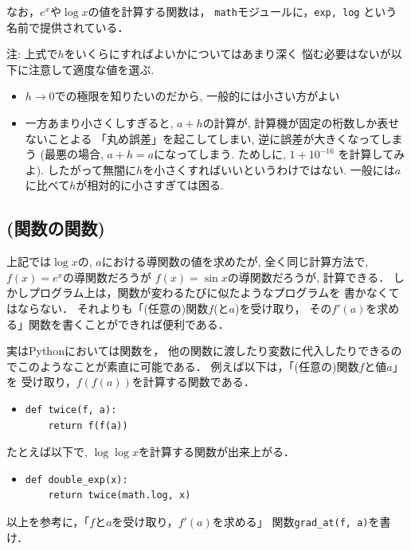 \documentclass[10pt,dvipdfmx]{article}
\begin{document}
なお，$e^x$や$\log x$の値を計算する関数は，
{\tt math}モジュールに，{\tt exp, log}
という名前で提供されている．

注: 上式で$h$をいくらにすればよいかについてはあまり深く
悩む必要はないが以下に注意して適度な値を選ぶ.
\begin{itemize}
\item $h \rightarrow 0$での極限を知りたいのだから, 一般的には小さい方がよい
\item 一方あまり小さくしすぎると, $a + h$の計算が,
  計算機が固定の桁数しか表せないことよる
  「丸め誤差」を起こしてしまい, 逆に誤差が大きくなってしまう
  (最悪の場合, $a + h = a$になってしまう.
  ためしに, $1 + 10^{-16}$ を計算してみよ).
  したがって無闇に$h$を小さくすればいいというわけではない.
  一般には$a$に比べて$h$が相対的に小さすぎては困る.
\end{itemize}

\subsection{{\scriptsize (関数の関数)}}
上記では$\log x$の, $a$における導関数の値を求めたが,
全く同じ計算方法で,
$f(x) = e^x$の導関数だろうが
$f(x) = \sin x$の導関数だろうが, 
計算できる．
しかしプログラム上は，関数が変わるたびに似たようなプログラムを
書かなくてはならない．
それよりも「(任意の)関数$f$(と$a$)を受け取り，
その$f'(a)$を求める」関数を書くことができれば便利である．

実はPythonにおいては関数を，
他の関数に渡したり変数に代入したりできるのでこのようなことが素直に可能である．
例えば以下は，「(任意の)関数$f$と値$a$」を
受け取り，$f(f(a))$を計算する関数である．

\begin{itemize}
\item []
\begin{lstlisting}
def twice(f, a):
    return f(f(a))  
\end{lstlisting}
\end{itemize}

たとえば以下で, $\log \log x$を計算する関数が出来上がる．

\begin{itemize}
\item []
\begin{lstlisting}
def double_exp(x):
    return twice(math.log, x)
\end{lstlisting}
\end{itemize}

以上を参考に，「$f$と$a$を受け取り，$f'(a)$を求める」
関数{\tt grad\_at(f, a)}を書け．
\end{document}
